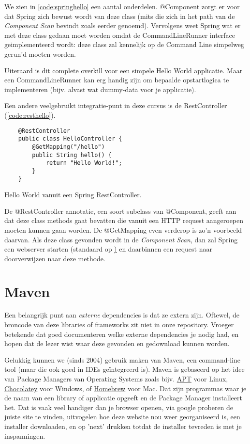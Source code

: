 We zien in \ref{code:springhello} een aantal onderdelen. @Component zorgt er voor dat Spring zich bewust wordt van
deze class (mits die zich in het path van de \emph{Component Scan} bevindt zoals eerder genoemd).
Vervolgens weet Spring wat er met deze class gedaan moet worden omdat de CommandLineRunner interface geimplementeerd wordt:
deze class zal kennelijk op de Command Line simpelweg gerun'd moeten worden.

Uiteraard is dit complete overkill voor een simpele Hello World applicatie. Maar een CommandLineRunner kan erg
handig zijn om bepaalde opstartlogica te implementeren (bijv. alvast wat dummy-data voor je applicatie).

Een andere veelgebruikt integratie-punt in deze cursus is de RestController (\ref{code:resthello}).

\begin{listing}[H]
    \begin{verbatim}
    @RestController
    public class HelloController {
        @GetMapping("/hello")
        public String hello() {
            return "Hello World!";
        }
    }
    \end{verbatim}
    \caption{Hello World vanuit een Spring RestController.}
    \label{code:resthello}
\end{listing}

De @RestController annotatie, een soort subclass van @Component, geeft aan dat deze class methods gaat bevatten
die vanuit een HTTP request aangeroepen moeten kunnen gaan worden. De @GetMapping even verderop is zo'n voorbeeld daarvan.
Als deze class gevonden wordt in de \emph{Component Scan}, dan zal Spring een webserver starten (standaard op
\href{http://localhost:8080}) en daarbinnen een request naar \href{http://localhost:8080/hello} doorverwijzen naar deze
methode.

\section{Maven}

Een belangrijk punt aan \emph{externe} dependencies is dat ze extern zijn. Oftewel, de broncode van deze 
libraries of frameworks zit niet in onze repository. Vroeger betekende dat goed documenteren welke externe 
dependencies je nodig had, en hopen dat de lezer wist waar deze gevonden en gedownload kunnen worden.

Gelukkig kunnen we (sinds 2004) gebruik maken van Maven, een command-line tool (maar die ook goed in IDEs geïntegreerd is). 
Maven is gebaseerd op het idee van Package Managers van
Operating Systems zoals bijv. \href{https://en.wikipedia.org/wiki/APT_(software)}{APT} voor Linux, 
\href{https://chocolatey.org/}{Chocolatey} voor Windows, of \href{https://brew.sh/}{Homebrew} voor Mac. 
Dat zijn programmas waar je de naam van een library of applicatie opgeeft en de Package Manager installeert het.
Dat is vaak veel handiger dan je browser openen, via google proberen de juiste site te vinden, 
uitvogelen hoe deze website nou weer georganiseerd is, een installer downloaden, 
en op 'next' drukken totdat de installer tevreden is met je inspanningen.

